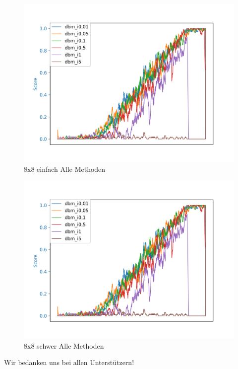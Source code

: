 \begin{figure}[H]
\centering
\includegraphics[width=\textwidth]{Figures/dbm9_4x4_dbm_i0,01_dbm_i0,05_dbm_i0,1_dbm_i0,5_dbm_i1_dbm_i5.png}
\caption{8x8 einfach Alle Methoden}
\label{all_7}
\end{figure}

\begin{figure}[H]
\centering
\includegraphics[width=\textwidth]{Figures/dbm9_4x4_dbm_i0,01_dbm_i0,05_dbm_i0,1_dbm_i0,5_dbm_i1_dbm_i5.png}
\caption{8x8 schwer Alle Methoden}
\label{all_8}
\end{figure}

\newpage

\begin{acknowledgement}
Wir bedanken uns bei allen Unterstützern!
\end{acknowledgement}